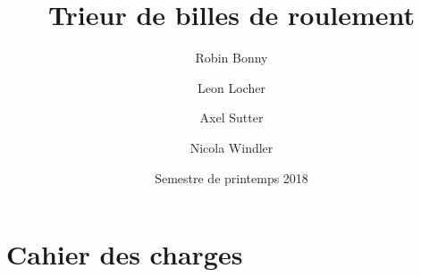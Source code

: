 \documentclass[french,a4paper,11pt]{report}
\title{Trieur de billes de roulement}
\author{Robin Bonny \and Leon Locher \and Axel Sutter \and Nicola Windler}
\date{Semestre de printemps 2018}
\begin{document}
\maketitle

\tableofcontents



\chapter{Cahier des charges}












\end{document}
